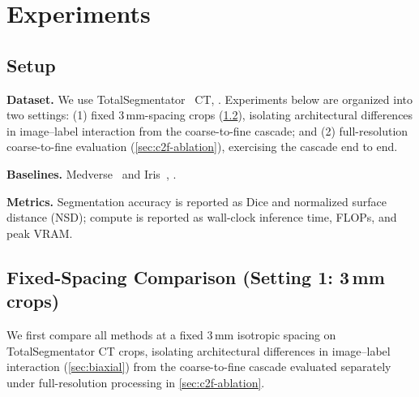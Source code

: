 \section{Experiments}
\label{sec:experiments}

\subsection{Setup}
\label{sec:setup}

\noindent\textbf{Dataset.} We use
TotalSegmentator~\cite{wasserthalTotalSegmentatorRobustSegmentation2023}
CT, . Experiments
below are organized into two settings: (1) fixed 3\,mm-spacing crops
(\cref{sec:fixed-spacing}), isolating architectural differences in
image--label interaction from the coarse-to-fine cascade; and (2)
full-resolution coarse-to-fine evaluation (\cref{sec:c2f-ablation}),
exercising the cascade end to end.

\noindent\textbf{Baselines.} Medverse~\cite{huMedverseUniversalModel2025a}
and Iris~\cite{gaoShowSegmentUniversal2025}, .

\noindent\textbf{Metrics.} Segmentation accuracy is reported as Dice and
normalized surface distance (NSD); compute is reported as wall-clock
inference time, FLOPs, and peak VRAM.

\subsection{Fixed-Spacing Comparison (Setting 1: 3\,mm crops)}
\label{sec:fixed-spacing}

We first compare all methods at a fixed 3\,mm isotropic spacing on
TotalSegmentator CT crops, isolating architectural differences in
image--label interaction (\cref{sec:biaxial}) from the coarse-to-fine
cascade evaluated separately under full-resolution processing in
\cref{sec:c2f-ablation}. 


